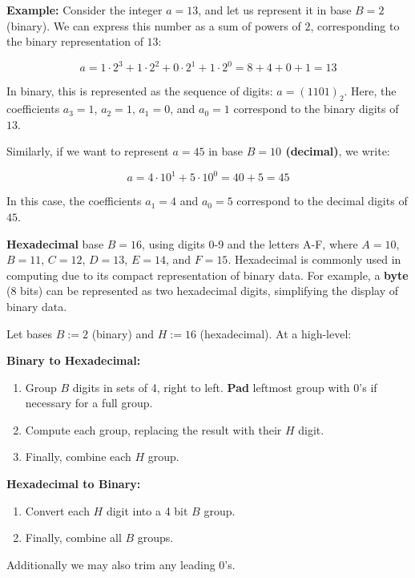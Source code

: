 \noindent
\textbf{Example:} Consider the integer $a = 13$, and let us represent it in base $B = 2$ (binary). We can express this number as a sum of powers of $2$, corresponding to the binary representation of $13$:
    
\[
a = 1 \cdot 2^3 + 1 \cdot 2^2 + 0 \cdot 2^1 + 1 \cdot 2^0 = 8 + 4 + 0 + 1 = 13
\]

\noindent
In binary, this is represented as the sequence of digits: $a = (1101)_2$. Here, the coefficients $a_3 = 1$, $a_2 = 1$, $a_1 = 0$, and $a_0 = 1$ correspond to the binary digits of $13$.

\noindent
Similarly, if we want to represent $a = 45$ in base \textbf{$B = 10$ (decimal)}, we write:

\[
a = 4 \cdot 10^1 + 5 \cdot 10^0 = 40 + 5 = 45
\]

\noindent
In this case, the coefficients $a_1 = 4$ and $a_0 = 5$ correspond to the decimal digits of $45$.


\begin{Def}[Hexadecimal]
    
        \textbf{Hexadecimal} base $B=16$, using digits 0-9 and the letters A-F, where $A=10$, $B=11$, $C=12$, $D=13$, $E=14$, and $F=15$. Hexadecimal is commonly used in computing due to its compact representation of binary data. For example, a \textbf{byte} (8 bits) can be represented as two hexadecimal digits, simplifying the display of binary data.
\end{Def}


\begin{theo}

    Let bases \( B:=2 \) (binary) and \( H:=16 \) (hexadecimal). At a high-level:

    \vspace{.5em}
    
    \noindent \textbf{Binary to Hexadecimal:}
    \begin{enumerate}
        \item Group $B$ digits in sets of 4, right to left. \textbf{Pad} leftmost group with 0's if necessary for a full group.
        \item Compute each group, replacing the result with their $H$ digit.
        \item Finally, combine each $H$ group.
    \end{enumerate}
    
    \noindent \textbf{Hexadecimal to Binary:}
    \begin{enumerate}
        \item Convert each $H$ digit into a 4 bit $B$ group.
        \item Finally, combine all $B$ groups.
    \end{enumerate}
    \noindent
    Additionally we may also trim any leading 0's.
\end{theo}

